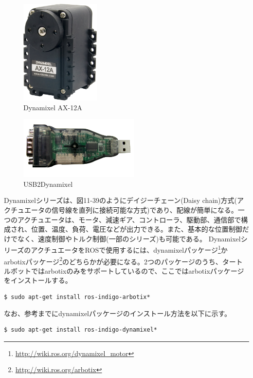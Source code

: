 \begin{figure}[htp]
  \centering
  \includegraphics[width=4cm]{pictures/chapter11/pic_11_37.png}
  \caption{Dynamixel AX-12A}
\end{figure}

\begin{figure}[htp]
  \centering
  \includegraphics[width=6cm]{pictures/chapter11/pic_11_38.png}
  \caption{USB2Dynamixel}
\end{figure}

Dynamixelシリーズは、図11-39のようにデイジーチェーン(Daisy chain)方式(アクチュエータの信号線を直列に接続可能な方式)であり、配線が簡単になる。一つのアクチュエータは、モータ、減速ギア、コントローラ、駆動部、通信部で構成され、位置、温度、負荷、電圧などが出力できる。また、基本的な位置制御だけでなく、速度制御やトルク制御(一部のシリーズ)も可能である。
DynamixelシリーズのアクチュエータをROSで使用するには、dynamixelパッケージ\footnote{\url{http://wiki.ros.org/dynamixel\_motor}}かarbotixパッケージ\footnote{\url{http://wiki.ros.org/arbotix}}のどちらかが必要になる。2つのパッケージのうち、タートルボットではarbotixのみをサポートしているので、ここではarbotixパッケージをインストールする。

\begin{lstlisting}[language=ROS]
$ sudo apt-get install ros-indigo-arbotix*
\end{lstlisting}

なお、参考までにdynamixelパッケージのインストール方法を以下に示す。

\begin{lstlisting}[language=ROS]
$ sudo apt-get install ros-indigo-dynamixel*
\end{lstlisting}

